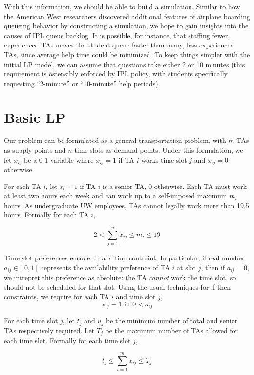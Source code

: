 \documentclass{article}
\begin{document}
\begin{multicols}{2}
With this information, we should be able to build a simulation. Similar to how the American West researchers discovered additional features of airplane boarding queueing behavior by constructing a simulation, we hope to gain insights into the causes of IPL queue backlog. It is possible, for instance, that staffing fewer, experienced TAs moves the student queue faster than many, less experienced TAs, since average help time could be minimized. To keep things simpler with the initial LP model, we can assume that questions take either 2 or 10 minutes (this requirement is ostensibly enforced by IPL policy, with students specifically requesting ``2-minute'' or ``10-minute'' help periods).

\section*{Basic LP}
Our problem can be formulated as a general transportation problem, with $m$ TAs as supply points and $n$ time slots as demand points. Under this formulation, we let $x_{ij}$ be a 0-1 variable where $x_{ij} = 1$ if TA $i$ works time slot $j$ and $x_{ij} = 0$ otherwise.

For each TA $i$, let $s_i = 1$ if TA $i$ is a senior TA, 0 otherwise. Each TA must work at least two hours each week and can work up to a self-imposed maximum $m_i$ hours. As undergraduate UW employees, TAs cannot legally work more than 19.5 hours. Formally for each TA $i$,

\begin{equation}
2 < \sum_{j=1}^{n}x_{ij} \leq m_i \leq 19
\end{equation}

Time slot preferences encode an addition contraint. In particular, if real number $a_{ij} \in [0,1]$ represents the availability preference of TA $i$ at slot $j$, then if $a_{ij} = 0$, we intrepret this preference as absolute: the TA \textit{cannot} work the time slot, so should not be scheduled for that slot. Using the usual techniques for if-then constraints, we require for each TA $i$ and time slot $j$,
\begin{equation}
x_{ij} = 1 \textrm{ iff } 0 < a_{ij}
\end{equation}

For each time slot $j$, let $t_j$ and $u_j$ be the minimum number of total and senior TAs respectively required. Let $T_j$ be the maximum number of TAs allowed for each time slot. Formally for each time slot $j$,

\begin{equation}
t_j \leq \sum_{i=1}^{m}x_{ij} \leq T_j
\end{equation}


\end{multicols}
\end{document}
